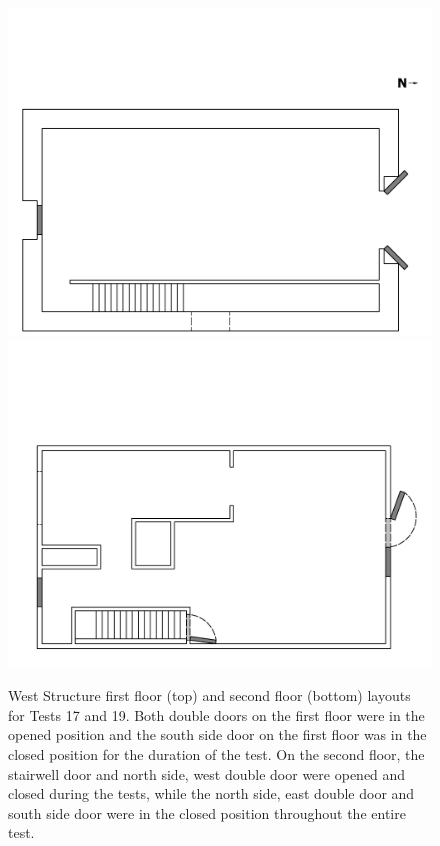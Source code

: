 \documentclass[12pt,oneside]{book}
\begin{document}
\begin{figure}[!ht]
\includegraphics[trim=0cm 0cm 0.75cm 4.5cm, clip=true, width=6in]{../Drawings/Specific_Tests/West_Structure_Hose_Test_19_1st_Floor}
\\
\includegraphics[trim=0cm 0cm 0.75cm 5cm, clip=true, width=6in]{../Drawings/Specific_Tests/West_Structure_Hose_Test_19_2nd_Floor}
\caption[West Structure Layout for Tests 17 and 19]{West Structure first floor (top) and second floor (bottom) layouts for Tests 17 and 19. Both double doors on the first floor were in the opened position and the south side door on the first floor was in the closed position for the duration of the test. On the second floor, the stairwell door and north side, west double door were opened and closed during the tests, while the north side, east double door and south side door were in the closed position throughout the entire test.}
\label{fig:flow_path_2}
\end{figure}
\FloatBarrier
\end{document}

